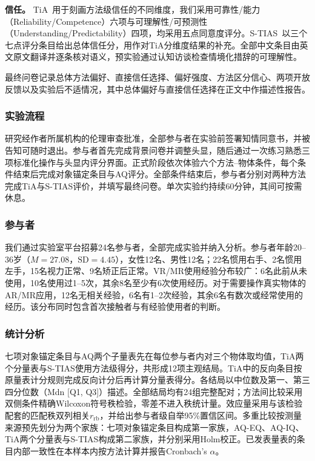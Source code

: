 \documentclass[review]{vgtc}
\begin{document}
\textbf{信任。}
TiA~\cite{koerber2019tia}用于刻画方法级信任的不同维度，我们采用可靠性/能力（Reliability/Competence）六项与可理解性/可预测性（Understanding/Predictability）四项，均采用五点同意度评分。S-TIAS~\cite{mcgrath2025stias}以三个七点评分条目给出总体信任分，用作对TiA分维度结果的补充。全部中文条目由英文原文翻译并逐条核对语义，预实验通过认知访谈检查情境化措辞的可理解性。

最终问卷记录总体方法偏好、直接信任选择、偏好强度、方法区分信心、两项开放反馈以及实验后不适情况，其中总体偏好与直接信任选择在正文中作描述性报告。

\subsubsection{实验流程}

研究经作者所属机构的伦理审查批准，全部参与者在实验前签署知情同意书，并被告知可随时退出。参与者首先完成背景问卷并调整头显，随后通过一次练习熟悉三项标准化操作与头显内评分界面。正式阶段依次体验六个方法--物体条件，每个条件结束后完成对象锚定条目与AQ评分。全部条件结束后，参与者分别对两种方法完成TiA与S-TIAS评价，并填写最终问卷。单次实验约持续60分钟，其间可按需休息。

\subsubsection{参与者}

我们通过实验室平台招募24名参与者，全部完成实验并纳入分析。参与者年龄20--36岁（$M=27.08$，$\mathrm{SD}=4.45$），女性12名、男性12名；22名惯用右手、2名惯用左手，15名视力正常、9名矫正后正常。VR/MR使用经验分布较广：6名此前从未使用，10名使用过1--5次，其余8名至少有6次使用经历。对于需要操作真实物体的AR/MR应用，12名无相关经验，6名有1--2次经验，其余6名有数次或经常使用的经历。该分布同时包含首次接触者与有经验使用者的判断。

\subsubsection{统计分析}

七项对象锚定条目与AQ两个子量表先在每位参与者内对三个物体取均值，TiA两个分量表与S-TIAS使用方法级得分，共形成12项主观结局。TiA中的反向条目按原量表计分规则完成反向计分后再计算分量表得分。各结局以中位数及第一、第三四分位数（Mdn [Q1, Q3]）描述。全部结局均有24组完整配对；方法间比较采用双侧条件精确Wilcoxon符号秩检验，零差不进入秩统计量。效应量采用与该检验配套的匹配秩双列相关$r_{\mathrm{rb}}$，并给出参与者级自举95\%置信区间。多重比较按测量来源预先划分为两个家族：七项对象锚定条目构成第一家族，AQ-EQ、AQ-IQ、TiA两个分量表与S-TIAS构成第二家族，并分别采用Holm校正。已发表量表的条目内部一致性在本样本内按方法计算并报告Cronbach's $\alpha$。
\end{document}
